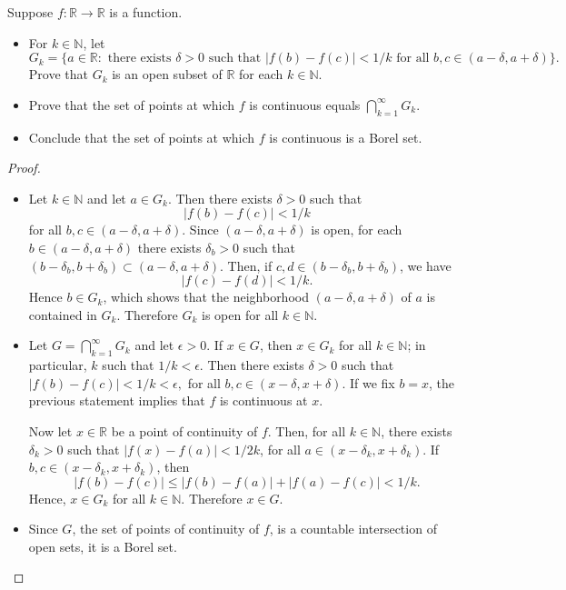 \documentclass[14.5pt]{article}
\newcommand{\N}{\mathbb{N}}
\newcommand{\R}{\mathbb{R}}
\newenvironment{problem}[2][Problem]{\begin{mdframed}[backgroundcolor=gray!10, leftline = false, rightline=false, linewidth=0.25pt]  \begin{trivlist}
\item[\hskip \labelsep {\bfseries #1}\hskip \labelsep {\bfseries #2.}]}{\end{trivlist} \end{mdframed}  }
\begin{document}
\begin{problem}{2B.12} Suppose $f: \R \rightarrow \R$ is a function.
\begin{itemize}
    \item[(a)] For $k \in \N$, let 
    $$ G_k = \{ a \in \R: \text{ there exists } \delta > 0 \text{ such that } |f(b) - f(c) | < 1 / k \text{ for all } b, c \in (a-\delta, a + \delta )\}.$$
    Prove that $G_k$ is an open subset of $\R$ for each $k \in \N.$
    \item[(b)] Prove that the set of points at which $f$ is continuous equals $\bigcap_{k=1}^\infty G_k.$
\item[(c)] Conclude that the set of points at which $f$ is continuous is a Borel set.
\end{itemize}
\end{problem}
\begin{proof} \text{ }
    \begin{itemize}
        \item[(a)] Let $k \in \N$ and let $a \in G_k$. Then there exists $\delta > 0$ such that 
    $$|f(b) - f(c)| < 1 / k$$ 
    for all $b, c \in (a - \delta, a + \delta).$ Since $(a - \delta, a + \delta)$ is open, for each $b\in (a - \delta, a + \delta)$ there exists $\delta_b > 0$ such that $(b - \delta_b, b + \delta_b) \subset (a - \delta, a + \delta).$ Then, if $c, d \in (b - \delta_b, b + \delta_b)$, we have 
    $$|f(c) - f(d)|  < 1 / k.$$
    Hence $b \in G_k$, which shows that the neighborhood $(a - \delta, a + \delta) $ of $a$  is contained in $G_k$. Therefore $G_k$ is open for all $k\in \N.$

    \item[(b)] Let $G = \bigcap_{k=1}^\infty G_k$ and let $\epsilon > 0$. If $x \in G$, then $x \in G_k$ for all $k\in \N$; in particular, $k$ such that $1 / k < \epsilon$. Then there exists $\delta > 0$ such that
    $|f(b) - f(c)| < 1 / k < \epsilon,$
    for all $b, c \in (x - \delta, x + \delta)$. If we fix $b = x$, the previous statement implies that $f$ is continuous at $x$.

    Now let $x \in \R$ be a point of continuity of $f$. Then, for all $k \in \N$, there exists $\delta_k > 0$ such that $|f(x) - f(a)| < 1 / 2k$, for all $a \in (x-\delta_k, x + \delta_k).$ If $b,c \in (x-\delta_k, x + \delta_k)$, then
    $$|f(b) - f(c) | \leq |f(b) - f(a)| + |f(a) - f(c) | < 1 / k.$$
    Hence, $x \in G_k$ for all $k\in \N.$ Therefore $x \in G.$
    \item[(c)] Since $G$, the set of points of continuity of $f$, is a countable intersection of open sets, it is a Borel set.
    \end{itemize}
\end{proof}
\end{document}
